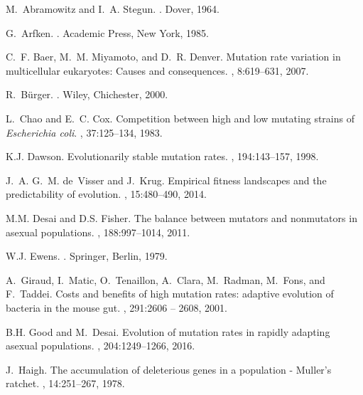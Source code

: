 \documentclass[preprint,12pt,number]{elsarticle}
\begin{document}
\begin{thebibliography}{10}

M.~Abramowitz and I.~A. Stegun.
.
\newblock Dover, 1964.

G.~Arfken.
.
\newblock Academic Press, New York, 1985.

C.~F. Baer, M.~M. Miyamoto, and D.~R. Denver.
\newblock Mutation rate variation in multicellular eukaryotes: Causes and
  consequences.
, 8:619--631, 2007.

R.~B{\"u}rger.
.
\newblock Wiley, Chichester, 2000.

L.~Chao and E.~C. Cox.
\newblock Competition between high and low mutating strains of {{\it
  Escherichia coli}}.
, 37:125--134, 1983.

K.J. Dawson.
\newblock Evolutionarily stable mutation rates.
, 194:143--157, 1998.

J.~A. G.~M. de~Visser and J.~Krug.
\newblock Empirical fitness landscapes and the predictability of evolution.
, 15:480--490, 2014.

M.M. Desai and D.S. Fisher.
\newblock The balance between mutators and nonmutators in asexual populations.
, 188:997--1014, 2011.

W.J. Ewens.
.
\newblock Springer, Berlin, 1979.

A.~Giraud, I.~Matic, O.~Tenaillon, A.~Clara, M.~Radman, M.~Fons, and F.~Taddei.
\newblock Costs and benefits of high mutation rates: adaptive evolution of
  bacteria in the mouse gut.
, 291:2606 -- 2608, 2001.

B.H. Good and M.~Desai.
\newblock Evolution of mutation rates in rapidly adapting asexual populations.
, 204:1249--1266, 2016.

J.~Haigh.
\newblock The accumulation of deleterious genes in a population - {M}uller's
  ratchet.
, 14:251--267, 1978.


\end{thebibliography}
\end{document}
